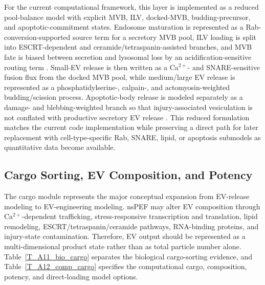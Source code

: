 \documentclass[Afour,sagev,times]{sagej}
\begin{document}
For the current computational framework, this layer is implemented as a reduced pool-balance model with explicit MVB, ILV, docked-MVB, budding-precursor, and apoptotic-commitment states. Endosome maturation is represented as a Rab-conversion-supported source term for a secretory MVB pool, ILV loading is split into ESCRT-dependent and ceramide/tetraspanin-assisted branches, and MVB fate is biased between secretion and lysosomal loss by an acidification-sensitive routing term \cite{ott2025coordination,choezom2022nsmase2,villarroyaBeltri2016isgylation}. Small-EV release is then written as a Ca$^{2+}$- and SNARE-sensitive fusion flux from the docked MVB pool, while medium/large EV release is represented as a phosphatidylserine-, calpain-, and actomyosin-weighted budding/scission process. Apoptotic-body release is modeled separately as a damage- and blebbing-weighted branch so that injury-associated vesiculation is not conflated with productive secretory EV release \cite{liu2023snare,messenger2018munc13,pang2025arf,teixeira2020rock1}. This reduced formulation matches the current code implementation while preserving a direct path for later replacement with cell-type-specific Rab, SNARE, lipid, or apoptosis submodels as quantitative data become available.



\subsection*{Cargo Sorting, EV Composition, and Potency}

The cargo module represents the major conceptual expansion from EV-release modeling to EV-engineering modeling. nsPEF may alter EV composition through Ca$^{2+}$-dependent trafficking, stress-responsive transcription and translation, lipid remodeling, ESCRT/tetraspanin/ceramide pathways, RNA-binding proteins, and injury-state contamination. Therefore, EV output should be represented as a multi-dimensional product state rather than as total particle number alone. Table~\ref{T_A11_bio_cargo} separates the biological cargo-sorting evidence, and Table~\ref{T_A12_comp_cargo} specifies the computational cargo, composition, potency, and direct-loading model options.
\end{document}
